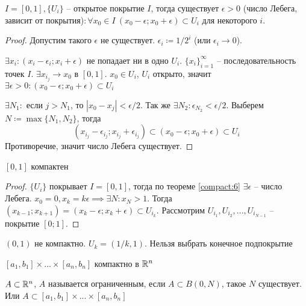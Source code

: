 \documentclass[main]{subfiles}
\begin{document}
\begin{lemma}[Лебега]\label{compact:6}
    $I = [0,1], \{U_i\}$ -- открытое покрытие $I$, тогда существует $\epsilon >0$
    (число Лебега, зависит от покрытия)$: \forall x_0  \in I\ (x_0 - \epsilon; x_0 + \epsilon) \subset U_i$ для некоторого $i$.
\end{lemma}
\begin{proof}
    Допустим такого $\epsilon$ не существует. $\epsilon_i \coloneqq 1/2^i$ (или  $\epsilon_i \to 0$).

    $\exists x_i: (x_i - \epsilon_i; x_i + \epsilon)$ не попадает ни в одно $U_i$.
    $\{x_i\}_{i=1}^{\infty}$ -- последовательность точек $I$.
    $\exists x_{i_j} \to x_0$ в $[0,1]$.
    $x_0 \in U_i$, $U_i$ открыто, значит $\exists \epsilon >0 : (x_0 - \epsilon; x_0 + \epsilon) \subset U_i$

    $\exists N_1:$ если $j > N_1$, то $|x_0 - x_j| < \epsilon/2$.
    Так же $\exists N_2: \epsilon_{N_2} < \epsilon/2$.
    Выберем $N\coloneqq \max\{N_1, N_2\}$, тогда
    \[(x_{i_j} - \epsilon_{i_j}; x_{i_j} + \epsilon_{i_j}) \subset (x_0 - \epsilon; x_0 + \epsilon) \subset U_i\]
    Противоречие, значит число Лебега существует.
\end{proof}

\begin{theorem}\label{compact:7}
    $[0,1]$ компактен
\end{theorem}
\begin{proof}
    $\{U_i\}$ покрывает $I = [0,1]$, тогда по теореме \ref{compact:6} $\exists \epsilon$ -- число Лебега.
    $x_0 = 0, x_k = k\epsilon \implies \exists N: x_N > 1$.
    Тогда $(x_{k-1}; x_{k+1}) = (x_k - \epsilon; x_k + \epsilon) \subset U_{i_k}$.
    Рассмотрим $U_{i_1}, U_{i_2}, ..., U_{i_{N-1}}$ -- покрытие $[0;1]$.
\end{proof}

\begin{remark}
    $(0,1)$ не компактно. $U_k = (1/k, 1)$. Нельзя выбрать конечное подпокрытие
\end{remark}
\begin{corollary}\label{compact:7:1}
    $[a_1, b_1] \times ... \times [a_n, b_n]$ компактно в $\mathbb{R}^n$
\end{corollary}

\begin{definition}
    $A \subset \mathbb{R}^n$, $A$ называется ограниченным, если $A \subset B(0, N)$, такое $N$ существует.
    Или $A \subset [a_1, b_1] \times ... \times [a_n, b_n]$
\end{definition}
\end{document}
